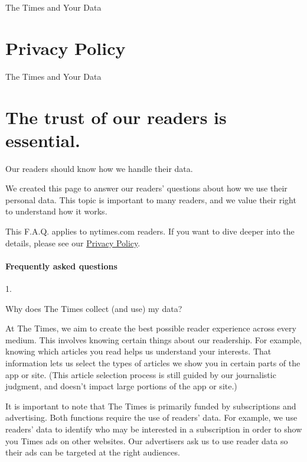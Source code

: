 The Times and Your Data

\hypertarget{privacy-policy}{%
\section{Privacy Policy}\label{privacy-policy}}

The Times and Your Data

\hypertarget{the-trust-of-our-readers-is-essential}{%
\section{The trust of our readers is
essential.}\label{the-trust-of-our-readers-is-essential}}

Our readers should know how we handle their data.

We created this page to answer our readers' questions about how we use
their personal data. This topic is important to many readers, and we
value their right to understand how it works.

This F.A.Q. applies to nytimes.com readers. If you want to dive deeper
into the details, please see our \href{/privacy/privacy-policy}{Privacy
Policy}.

\hypertarget{frequently-asked-questions}{%
\paragraph{Frequently asked
questions}\label{frequently-asked-questions}}

1.

Why does The Times collect (and use) my data?

At The Times, we aim to create the best possible reader experience
across every medium. This involves knowing certain things about our
readership. For example, knowing which articles you read helps us
understand your interests. That information lets us select the types of
articles we show you in certain parts of the app or site. (This article
selection process is still guided by our journalistic judgment, and
doesn't impact large portions of the app or site.)

It is important to note that The Times is primarily funded by
subscriptions and advertising. Both functions require the use of
readers' data. For example, we use readers' data to identify who may be
interested in a subscription in order to show you Times ads on other
websites. Our advertisers ask us to use reader data so their ads can be
targeted at the right audiences.

